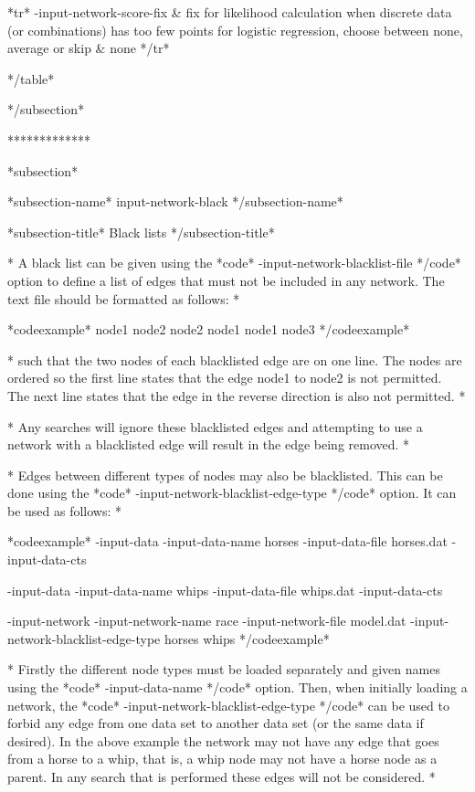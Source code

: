 *tr* -input-network-score-fix & fix for likelihood calculation when discrete data (or combinations) has too few points for logistic regression, choose between none, average or skip & none */tr*

*/table*

*/subsection*

*************

*subsection*

*subsection-name* input-network-black */subsection-name*

*subsection-title* Black lists */subsection-title*

* A black list can be given using the *code* -input-network-blacklist-file */code* option to define a list of edges that must not be included in any network. The text file should be formatted as follows: *

*codeexample* node1 node2 node2 node1 node1 node3 */codeexample*

* such that the two nodes of each blacklisted edge are on one line. The nodes are ordered so the first line states that the edge node1 to node2 is not permitted. The next line states that the edge in the reverse direction is also not permitted. *

* Any searches will ignore these blacklisted edges and attempting to use a network with a blacklisted edge will result in the edge being removed. *

* Edges between different types of nodes may also be blacklisted. This can be done using the *code* -input-network-blacklist-edge-type */code* option. It can be used as follows: *

*codeexample* -input-data -input-data-name horses -input-data-file horses.dat -input-data-cts

-input-data -input-data-name whips -input-data-file whips.dat -input-data-cts

-input-network -input-network-name race -input-network-file model.dat -input-network-blacklist-edge-type horses whips */codeexample*

* Firstly the different node types must be loaded separately and given names using the *code* -input-data-name */code* option. Then, when initially loading a network, the *code* -input-network-blacklist-edge-type */code* can be used to forbid any edge from one data set to another data set (or the same data if desired). In the above example the network may not have any edge that goes from a horse to a whip, that is, a whip node may not have a horse node as a parent. In any search that is performed these edges will not be considered. *



